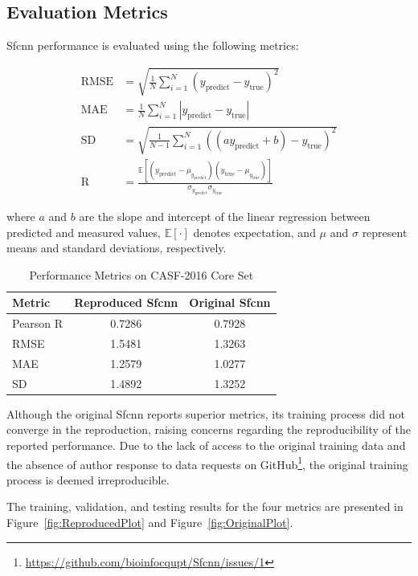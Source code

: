 \documentclass[unnumsec,webpdf,contemporary,large]{oup-authoring-template}
\theoremstyle{thmstyleone}%
\theoremstyle{thmstyletwo}%
\theoremstyle{thmstylethree}%
\begin{document}
\subsection{Evaluation Metrics}
\vspace{0.5em}
Sfcnn performance is evaluated using the following metrics:

\begin{align*}
\mathrm{RMSE} &= \sqrt{\frac{1}{N} \sum_{i=1}^{N} (y_{\text{predict}} - y_{\text{true}})^2} \\
\mathrm{MAE} &= \frac{1}{N} \sum_{i=1}^{N} |y_{\text{predict}} - y_{\text{true}}| \\
\mathrm{SD} &= \sqrt{\frac{1}{N-1} \sum_{i=1}^{N} ((a y_{\text{predict}} + b) - y_{\text{true}})^2} \\
\mathrm{R} &= \frac{\mathbb{E}[(y_{\text{predict}} - \mu_{y_{\text{predict}}})(y_{\text{true}} - \mu_{y_{\text{true}}})]}{\sigma_{y_{\text{predict}}} \sigma_{y_{\text{true}}}}
\end{align*}

where $a$ and $b$ are the slope and intercept of the linear regression between predicted and measured values, $\mathbb{E}[\cdot]$ denotes expectation, and $\mu$ and $\sigma$ represent means and standard deviations, respectively.

\begin{table}[H]
\centering
\caption{Performance Metrics on CASF-2016 Core Set}
\label{tab:metrics}
\begin{tabular}{lcc}
\toprule
Metric & Reproduced Sfcnn & Original Sfcnn \\
\midrule
Pearson R & 0.7286 & 0.7928 \\
RMSE & 1.5481 & 1.3263 \\
MAE & 1.2579 & 1.0277 \\
SD & 1.4892 & 1.3252 \\
\bottomrule
\end{tabular}
\end{table}

Although the original Sfcnn reports superior metrics, its training process did not converge in the reproduction, raising concerns regarding the reproducibility of the reported performance. Due to the lack of access to the original training data and the absence of author response to data requests on GitHub\footnote{\url{https://github.com/bioinfocqupt/Sfcnn/issues/1}}, the original training process is deemed irreproducible.

The training, validation, and testing results for the four metrics are presented in Figure~\ref{fig:ReproducedPlot} and Figure~\ref{fig:OriginalPlot}.
\end{document}
